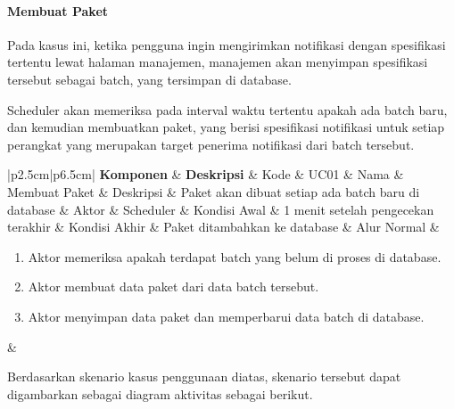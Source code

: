 \newcommand\tableUcDesc[7] {
\begin{longtable}{|p{2.5cm}|p{6.5cm}|}
    \hline
    \textbf{Komponen} & \textbf{Deskripsi} & \hline
    Kode & #1 & \hline
    Nama & #2 & \hline
    Deskripsi & #3 & \hline
    Aktor & #4 & \hline
    Kondisi Awal & #5 & \hline
    Kondisi Akhir & #6 & \hline
    Alur Normal & #7 & \hline
    \caption{Kasus Penggunaan #2}
\end{longtable}
}

\paragraph{Membuat Paket}
\par Pada kasus ini, ketika pengguna ingin mengirimkan notifikasi dengan spesifikasi tertentu lewat halaman manajemen,
manajemen akan menyimpan spesifikasi tersebut sebagai batch, yang tersimpan di database.
\par Scheduler akan memeriksa pada interval waktu tertentu apakah ada batch baru, dan kemudian membuatkan paket, yang
berisi spesifikasi notifikasi untuk setiap perangkat yang merupakan target penerima notifikasi dari batch tersebut.
\tableUcDesc
{UC01}
{Membuat Paket}
{Paket akan dibuat setiap ada batch baru di database}
{Scheduler}
{1 menit setelah pengecekan terakhir}
{Paket ditambahkan ke database}
{
\begin{enumerate}
    \item Aktor memeriksa apakah terdapat batch yang belum di proses di database.
    \item Aktor membuat data paket dari data batch tersebut.
    \item Aktor menyimpan data paket dan memperbarui data batch di database.
\end{enumerate}
}
\par Berdasarkan skenario kasus penggunaan diatas, skenario tersebut dapat digambarkan sebagai diagram aktivitas
sebagai berikut.

